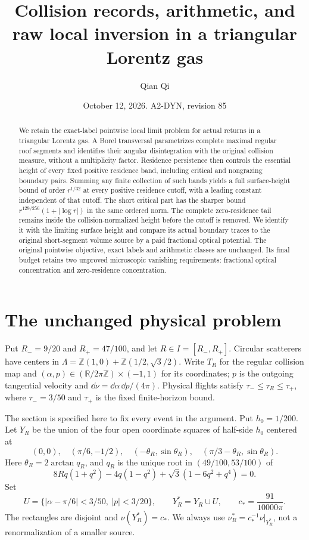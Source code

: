 \documentclass[11pt,reqno]{amsart}
\title[Collision records and raw local inversion]{Collision records, arithmetic, and raw local inversion in a triangular Lorentz gas}
\author{Qian Qi}
\date{October 12, 2026. A2-DYN, revision 85}
\numberwithin{equation}{section}
\theoremstyle{definition}
\theoremstyle{remark}\newtheorem{remark}[theorem]{Remark}
\newcommand{\R}{\mathbb R}\newcommand{\Z}{\mathbb Z}
\begin{document}
\raggedbottom
\begin{abstract}
We retain the exact-label pointwise local limit problem for actual returns
in a triangular Lorentz gas. A Borel transversal parametrizes complete
maximal regular roof segments and identifies their angular disintegration
with the original collision measure, without a multiplicity factor.
Residence persistence then controls the essential height of every fixed
positive residence band, including critical and nongrazing boundary pairs.
Summing any finite collection of such bands yields a full surface-height
bound of order $r^{1/32}$ at every positive residence cutoff, with a leading
constant independent of that cutoff. The short critical part has the
sharper bound $r^{129/256}(1+|\log r|)$ in the same ordered norm.
The complete zero-residence tail remains inside the collision-normalized
height before the cutoff is removed. We identify it with the limiting
surface height and compare its actual boundary traces to the original
short-segment volume source by a paid fractional optical potential.
The original pointwise objective, exact labels and arithmetic classes
are unchanged. Its final budget retains two unproved microscopic
vanishing requirements: fractional optical concentration and
zero-residence concentration.
\end{abstract}
\maketitle

\section{The unchanged physical problem}
Put $R_-=9/20$ and $R_+=47/100$, and let $R\in I=[R_-,R_+]$. Circular scatterers have centers in
$\Lambda=\Z(1,0)+\Z(1/2,\sqrt3/2)$. Write $T_R$ for the regular
collision map and $(\alpha,p)\in(\R/2\pi\Z)\times(-1,1)$ for its
coordinates; $p$ is the outgoing tangential velocity and
$\dd\nu=\dd\alpha\,\dd p/(4\pi)$. Physical flights satisfy
$\tau_-\le\tau_R\le\tau_+$, where $\tau_-=3/50$ and $\tau_+$
is the fixed finite-horizon bound.

The section is specified here to fix every event in the argument.
Put $h_0=1/200$. Let $Y_R$ be the union of the four open coordinate
squares of half-side $h_0$ centered at
\[
 (0,0),\quad(\pi/6,-1/2),\quad
 (-\theta_R,\sin\theta_R),\quad
 (\pi/3-\theta_R,\sin\theta_R).
\]
Here $\theta_R=2\arctan q_R$, and $q_R$ is the unique root in
$(49/100,53/100)$ of
\[
 8Rq(1+q^2)-4q(1-q^2)+\sqrt3(1-6q^2+q^4)=0.
\]
Set
\[
 U=\{|\alpha-\pi/6|<3/50,\ |p|<3/20\},\qquad
 Y_R^*=Y_R\cup U,\qquad c_*=\frac{91}{10000\pi}.
\]
The rectangles are disjoint and $\nu(Y_R^*)=c_*$. We always use
$\nu_R^*=c_*^{-1}\nu|_{Y_R^*}$, not a renormalization of a smaller
source.
\end{document}
